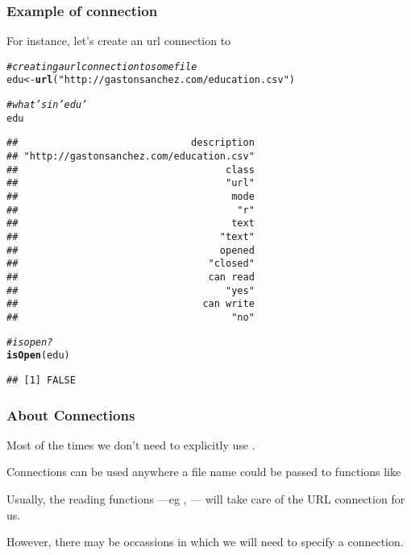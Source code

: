 \documentclass[12pt]{beamer}\usepackage[]{graphicx}\usepackage[]{color}
\makeatletter
\newcommand{\hlstr}[1]{\textcolor[rgb]{0.192,0.494,0.8}{#1}}%
\newcommand{\hlcom}[1]{\textcolor[rgb]{0.678,0.584,0.686}{\textit{#1}}}%
\newcommand{\hlstd}[1]{\textcolor[rgb]{0.345,0.345,0.345}{#1}}%
\newcommand{\hlkwb}[1]{\textcolor[rgb]{0.69,0.353,0.396}{#1}}%
\newcommand{\hlkwd}[1]{\textcolor[rgb]{0.737,0.353,0.396}{\textbf{#1}}}%
\newenvironment{kframe}{%
 \def\at@end@of@kframe{}%
 \ifinner\ifhmode%
  \def\at@end@of@kframe{\end{minipage}}%
  \begin{minipage}{\columnwidth}%
 \fi\fi%
 \def\FrameCommand##1{\hskip\@totalleftmargin \hskip-\fboxsep
 \colorbox{shadecolor}{##1}\hskip-\fboxsep
     \hskip-\linewidth \hskip-\@totalleftmargin \hskip\columnwidth}%
 \MakeFramed {\advance\hsize-\width
   \@totalleftmargin\z@ \linewidth\hsize
   \@setminipage}}%
 {\par\unskip\endMakeFramed%
 \at@end@of@kframe}
\newenvironment{knitrout}{}{} %
\makeatother
\begin{document}
\begin{frame}[fragile]
\frametitle{Example of  connection}

For instance, let's create an url connection to 
\begin{knitrout}\tiny
{}\color{fgcolor}\begin{kframe}
\begin{alltt}
\hlcom{# creating a url connection to some file}
\hlstd{edu} \hlkwb{<-} \hlkwd{url}\hlstd{(}\hlstr{"http://gastonsanchez.com/education.csv"}\hlstd{)}

\hlcom{# what's in 'edu'}
\hlstd{edu}
\end{alltt}
\begin{verbatim}
##                              description 
## "http://gastonsanchez.com/education.csv" 
##                                    class 
##                                    "url" 
##                                     mode 
##                                      "r" 
##                                     text 
##                                   "text" 
##                                   opened 
##                                 "closed" 
##                                 can read 
##                                    "yes" 
##                                can write 
##                                     "no"
\end{verbatim}
\begin{alltt}
\hlcom{# is open?}
\hlkwd{isOpen}\hlstd{(edu)}
\end{alltt}
\begin{verbatim}
## [1] FALSE
\end{verbatim}
\end{kframe}
\end{knitrout}

\end{frame}


\begin{frame}
\frametitle{About Connections}

\bi
  \item Most of the times we don't need to explicitly use . 
  \item Connections can be used anywhere a file name could be passed to functions like  
  \item Usually, the reading functions ---eg , --- will take care of the URL connection for us.
  \item However, there may be occassions in which we will need to specify a  connection.
\ei
\eb

\end{frame}
\end{document}
